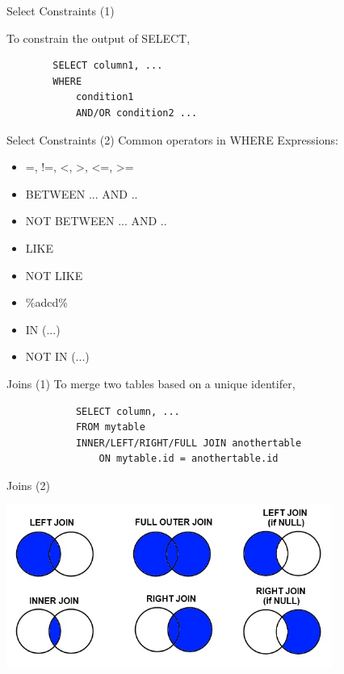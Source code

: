 \documentclass{beamer}
\begin{document}
    \begin{frame}[fragile]{Select Constraints (1)}

        To \alert{constrain} the output of SELECT,
        \begin{verbatim}
        SELECT column1, ... 
        WHERE 
            condition1
            AND/OR condition2 ...
        \end{verbatim}
    \end{frame}

    
    \begin{frame}[fragile]{Select Constraints (2)}
        Common operators in WHERE Expressions:
        \begin{itemize}
            \item =, !=, <, >, <=, >=
            \item BETWEEN ... AND ..
            \item NOT BETWEEN ... AND ..
            \item LIKE
            \item NOT LIKE
            \item \%adcd\%
            \item IN (...)
            \item NOT IN (...)
        \end{itemize}
    \end{frame}

    \begin{frame}[fragile]{Joins (1)}
        To \alert{merge} two tables based on a unique identifer,
        \begin{verbatim}
            SELECT column, ...
            FROM mytable
            INNER/LEFT/RIGHT/FULL JOIN anothertable
                ON mytable.id = anothertable.id
        \end{verbatim}
    \end{frame}
    
    \begin{frame}{Joins (2)}
        \begin{center}
            \includegraphics[width=0.8\textwidth]{figures/joins.jpg}
        \end{center}
    \end{frame}
\end{document}
